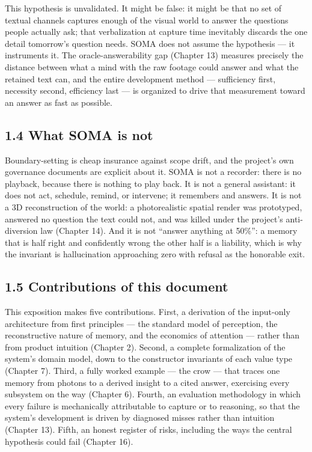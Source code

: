 This hypothesis is unvalidated. It might be false: it might be that no set of textual channels captures enough of the visual world to answer the questions people actually ask; that verbalization at capture time inevitably discards the one detail tomorrow's question needs. SOMA does not assume the hypothesis --- it instruments it. The oracle-answerability gap (Chapter 13) measures precisely the distance between what a mind with the raw footage could answer and what the retained text can, and the entire development method --- sufficiency first, necessity second, efficiency last --- is organized to drive that measurement toward an answer as fast as possible.

\subsection{1.4 What SOMA is not}\label{what-soma-is-not}

Boundary-setting is cheap insurance against scope drift, and the project's own governance documents are explicit about it. SOMA is not a recorder: there is no playback, because there is nothing to play back. It is not a general assistant: it does not act, schedule, remind, or intervene; it remembers and answers. It is not a 3D reconstruction of the world: a photorealistic spatial render was prototyped, answered no question the text could not, and was killed under the project's anti-diversion law (Chapter 14). And it is not ``answer anything at 50\%'': a memory that is half right and confidently wrong the other half is a liability, which is why the invariant is hallucination approaching zero with refusal as the honorable exit.

\subsection{1.5 Contributions of this document}\label{contributions-of-this-document}

This exposition makes five contributions. First, a derivation of the input-only architecture from first principles --- the standard model of perception, the reconstructive nature of memory, and the economics of attention --- rather than from product intuition (Chapter 2). Second, a complete formalization of the system's domain model, down to the constructor invariants of each value type (Chapter 7). Third, a fully worked example --- the crow --- that traces one memory from photons to a derived insight to a cited answer, exercising every subsystem on the way (Chapter 6). Fourth, an evaluation methodology in which every failure is mechanically attributable to capture or to reasoning, so that the system's development is driven by diagnosed misses rather than intuition (Chapter 13). Fifth, an honest register of risks, including the ways the central hypothesis could fail (Chapter 16).


